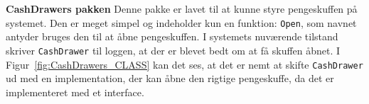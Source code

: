 \textbf{CashDrawers pakken}
\newline
Denne pakke er lavet til at kunne styre pengeskuffen på systemet. Den er meget simpel og indeholder kun en funktion: \texttt{Open}, som navnet antyder bruges den til at åbne pengeskuffen.
I systemets nuværende tilstand skriver \texttt{CashDrawer} til loggen, at der er blevet bedt om at få skuffen åbnet.
I Figur~\ref{fig:CashDrawers_CLASS} kan det ses, at det er nemt at skifte \texttt{CashDrawer} ud med en implementation, der kan åbne den rigtige pengeskuffe, da det er implementeret med et interface.

